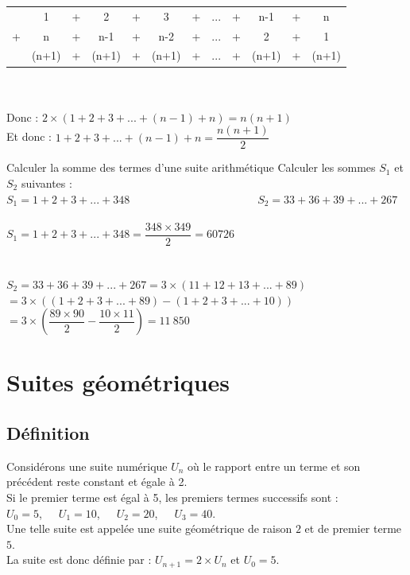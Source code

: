 \begin{bdemo}
	\begin{tabular}{ c c c c c c c c c c c c }			
		& 1 & + & 2 & + & 3 & + &... & + &n-1 & + & n \\
		+ & n & + & n-1 & + & n-2 & + & ...& + & 2 & + & 1 \\
		\hline
		& (n+1) & + & (n+1) & + & (n+1) & + & ... & + & (n+1) & + & (n+1)\\
	\end{tabular} \\
	\\
	Donc : $2\times (1+2+3+...+(n-1)+n)=n(n+1)$\\
	Et donc : $1+2+3+...+(n-1)+n=\dfrac{n(n+1)}{2}$
\end{bdemo}

\begin{bmethodet}{Calculer la somme des termes d'une suite arithmétique}
	Calculer les sommes $S_1$ et $S_2$ suivantes :\\ 
	$S_1=1+2+3+...+348$\ \ \ \ \ \ \ \ \ \ \ \ \ \ \ \ \ \ \ \ \ \ \ $S_2=33+36+39+...+267$
	\\
	\\
	$S_1=1+2+3+...+348=\dfrac{348\times 349}{2}=60726$\\
	\\
	\\
	$S_2=33+36+39+...+267=3\times(11+12+13+...+89)$\\
	$=3\times((1+2+3+...+89)-(1+2+3+...+10))$\\
	$=3\times \left(\dfrac{89\times 90}{2}-\dfrac{10\times11}{2}\right)=11\ 850$
\end{bmethodet}

\section{Suites géométriques}

\subsection{Définition}

\begin{bexemple}
	Considérons une suite numérique $U_n$ où le rapport entre un terme et son précédent reste constant et égale à 2.\\
	Si le premier terme est égal à 5, les premiers termes successifs sont :\\
	$U_0 = 5$,\ \ \ 
	$U_1 = 10$,\ \ \ 
	$U_2 = 20$,\ \ \ 
	$U_3 = 40$.\\
	Une telle suite est appelée une suite géométrique de raison $2$ et de premier terme $5$.\\
	La suite est donc définie par : $U_{n+1}=2\times U_n$ et $U_0=5$. 
\end{bexemple}


